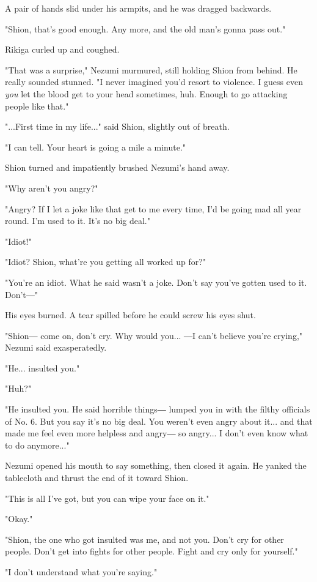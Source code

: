 A pair of hands slid under his armpits, and he was dragged backwards.

"Shion, that's good enough. Any more, and the old man's gonna pass out."

Rikiga curled up and coughed.

"That was a surprise," Nezumi murmured, still holding Shion from behind.
He really sounded stunned. "I never imagined you'd resort to violence. I
guess even \emph{you} let the blood get to your head sometimes, huh. Enough to
go attacking people like that."

"...First time in my life..." said Shion, slightly out of breath.

"I can tell. Your heart is going a mile a minute."

Shion turned and impatiently brushed Nezumi's hand away.

"Why aren't you angry?"

"Angry? If I let a joke like that get to me every time, I'd be going mad
all year round. I'm used to it. It's no big deal."

"Idiot!"

"Idiot? Shion, what're you getting all worked up for?"

"You're an idiot. What he said wasn't a joke. Don't say you've gotten
used to it. Don't―"

His eyes burned. A tear spilled before he could screw his eyes shut.

"Shion― come on, don't cry. Why would you... ―I can't believe you're
crying," Nezumi said exasperatedly.

"He... insulted you."

"Huh?"

"He insulted you. He said horrible things― lumped you in with the filthy
officials of No. 6. But you say it's no big deal. You weren't even angry
about it... and that made me feel even more helpless and angry― so
angry... I don't even know what to do anymore..."

Nezumi opened his mouth to say something, then closed it again. He
yanked the tablecloth and thrust the end of it toward Shion.

"This is all I've got, but you can wipe your face on it."

"Okay."

"Shion, the one who got insulted was me, and not you. Don't cry for
other people. Don't get into fights for other people. Fight and cry only
for yourself."

"I don't understand what you're saying."

